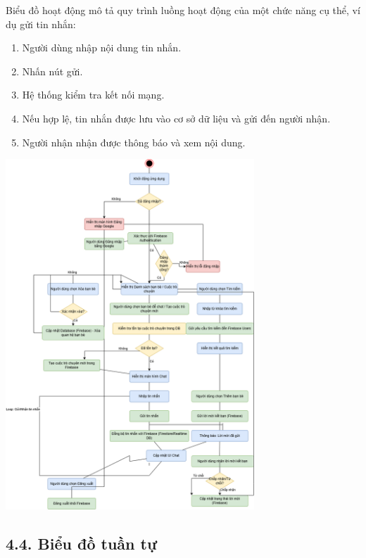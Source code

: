 \documentclass[12pt,a4paper]{article}
\begin{document}
	\noindent
	Biểu đồ hoạt động mô tả quy trình luồng hoạt động của một chức năng cụ thể, ví dụ gửi tin nhắn:
	\begin{enumerate}
		\item Người dùng nhập nội dung tin nhắn.
		\item Nhấn nút gửi.
		\item Hệ thống kiểm tra kết nối mạng.
		\item Nếu hợp lệ, tin nhắn được lưu vào cơ sở dữ liệu và gửi đến người nhận.
		\item Người nhận nhận được thông báo và xem nội dung.
	\end{enumerate}
	\includegraphics[width=0.7\textwidth]{sodo.png}\\[0.5cm]
	
	\vspace{0.7cm}
	
	\subsection*{4.4. Biểu đồ tuần tự}
	\vspace{0.1cm}
	
\end{document}

